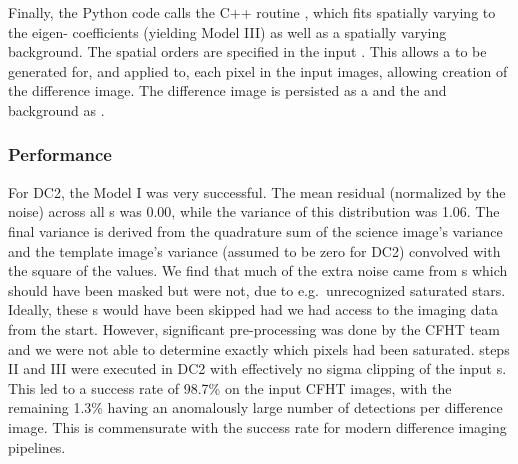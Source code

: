 Finally, the Python code calls the C++ routine
, which fits 
spatially varying  to the eigen-
coefficients (yielding  Model III) as well as a spatially
varying background.  The spatial orders are specified in the input
.  This allows a  to be generated for, and
applied to, each pixel in the input images, allowing creation of the
difference image.  The difference image is persisted as a
 and the  and background as
.

\subsubsection{Performance}
\label{ImageSubtraction-Performance}

For DC2, the  Model I was very successful.  The mean
residual (normalized by the noise) across all s was
0.00, while the variance of this distribution was 1.06.  The final
variance is derived from the quadrature sum of the science image's
variance and the template image's variance (assumed to be zero for
DC2) convolved with the square of the  values.  We find
that much of the extra noise came from s which should
have been masked but were not, due to e.g.~unrecognized saturated
stars.  Ideally, these s would have been skipped had
we had access to the imaging data from the start.  However,
significant pre-processing was done by the CFHT team and we were not
able to determine exactly which pixels had been saturated.
 steps II and III were executed in DC2 with effectively
no sigma clipping of the input s.  This led to a success
rate of 98.7\% on the input CFHT images, with the remaining 1.3\%
having an anomalously large number of
detections per difference image.  This is commensurate with the
success rate for modern difference imaging pipelines.

